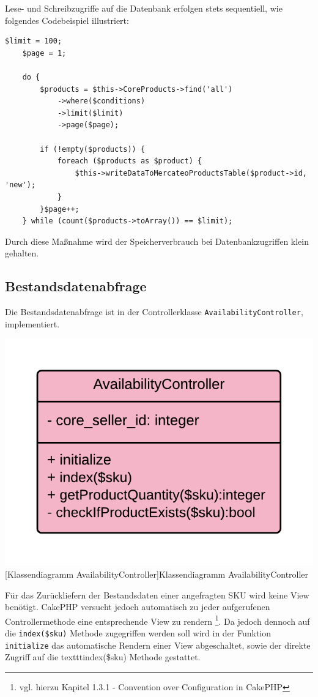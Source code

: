 	Lese- und Schreibzugriffe auf die Datenbank erfolgen stets sequentiell, wie folgendes Codebeispiel illustriert:
	\lstset{language=php}
	\begin{lstlisting}[caption={Sequentielles Schreiben}]
	$limit = 100;
	$page = 1;
	
	do {
	    $products = $this->CoreProducts->find('all')
	        ->where($conditions)
	        ->limit($limit)
	        ->page($page);
	        
	    if (!empty($products)) {
	        foreach ($products as $product) {        
	            $this->writeDataToMercateoProductsTable($product->id, 'new');
	        }
	    }$page++;
	} while (count($products->toArray()) == $limit);
	\end{lstlisting} 
	Durch diese Maßnahme wird der Speicherverbrauch bei Datenbankzugriffen klein gehalten.
	
	\subsection{Bestandsdatenabfrage}
	
	Die Bestandsdatenabfrage ist in der Controllerklasse \texttt{AvailabilityController}, implementiert.
	
	\begin{minipage}{\linewidth}
		\vspace{1em}
		\centering
		\includegraphics[width=0.4 \linewidth]{img/AvailabilityControllerUML}
		[Klassendiagramm AvailabilityController]{Klassendiagramm AvailabilityController}
		\vspace{1em}
	\end{minipage}
	
	Für das Zurückliefern der Bestandsdaten einer angefragten SKU wird keine View benötigt. CakePHP versucht jedoch automatisch zu jeder aufgerufenen Controllermethode eine entsprechende View zu rendern \footnote{vgl. hierzu Kapitel 1.3.1 - Convention over Configuration in CakePHP}.  Da jedoch dennoch auf die \texttt{index(\$sku)} Methode zugegriffen werden soll wird in der Funktion \texttt{initialize} das automatische Rendern einer View abgeschaltet, sowie der direkte Zugriff auf die texttt{index(\$sku)} Methode gestattet.
	
